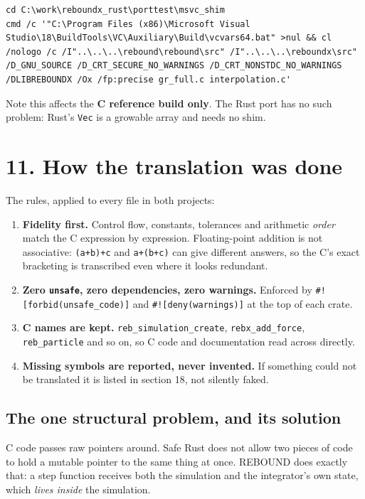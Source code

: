 \documentclass[11pt]{article}
\begin{document}
\begin{lstlisting}
cd C:\work\reboundx_rust\porttest\msvc_shim
cmd /c '"C:\Program Files (x86)\Microsoft Visual Studio\18\BuildTools\VC\Auxiliary\Build\vcvars64.bat" >nul && cl /nologo /c /I"..\..\..\rebound\rebound\src" /I"..\..\..\reboundx\src" /D_GNU_SOURCE /D_CRT_SECURE_NO_WARNINGS /D_CRT_NONSTDC_NO_WARNINGS /DLIBREBOUNDX /Ox /fp:precise gr_full.c interpolation.c'
\end{lstlisting}

Note this affects the \textbf{C reference build only}. The Rust port has no such problem: Rust's \texttt{Vec} is a growable array and needs no shim.

\section{11. How the translation was done}

The rules, applied to every file in both projects:

\begin{enumerate}
\item \textbf{Fidelity first.} Control flow, constants, tolerances and arithmetic \emph{order} match the C expression by expression. Floating-point addition is not associative: \texttt{(a+b)+c} and \texttt{a+(b+c)} can give different answers, so the C's exact bracketing is transcribed even where it looks redundant.
\item \textbf{Zero \texttt{unsafe}, zero dependencies, zero warnings.} Enforced by \texttt{\#![forbid(unsafe\_code)]} and \texttt{\#![deny(warnings)]} at the top of each crate.
\item \textbf{C names are kept.} \texttt{reb\_simulation\_create}, \texttt{rebx\_add\_force}, \texttt{reb\_particle} and so on, so C code and documentation read across directly.
\item \textbf{Missing symbols are reported, never invented.} If something could not be translated it is listed in section 18, not silently faked.
\end{enumerate}

\subsection{The one structural problem, and its solution}

C code passes raw pointers around. Safe Rust does not allow two pieces of code to hold a mutable pointer to the same thing at once. REBOUND does exactly that: a step function receives both the simulation and the integrator's own state, which \emph{lives inside} the simulation.
\end{document}
